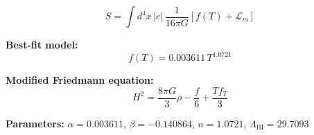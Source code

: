 
\begin{equation}
  S = \int d^4x \, |e| \, \frac{1}{16\pi G} \left[ f(T) + \mathcal{L}_m \right]
\end{equation}

\textbf{Best-fit model:}
\begin{equation}
  f(T) = 0.003611 \, T^{1.0721}
\end{equation}

\textbf{Modified Friedmann equation:}
\begin{equation}
  H^2 = \frac{8\pi G}{3} \rho - \frac{f}{6} + \frac{T f_T}{3}
\end{equation}

\textbf{Parameters:}
$\alpha = 0.003611$, \quad
$\beta = -0.140864$, \quad
$n = 1.0721$, \quad
$\Lambda_{\text{BI}} = 29.7093$